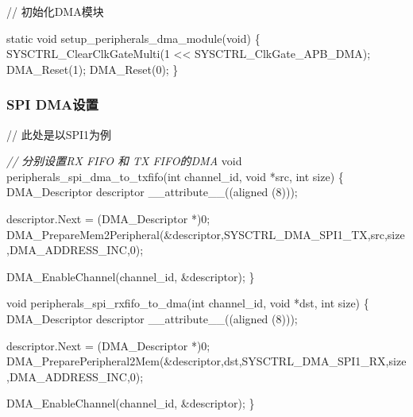 \documentclass[
  12pt,
]{book}
\newenvironment{Shaded}{\begin{snugshade}}{\end{snugshade}}
\newcommand{\CommentTok}[1]{\textcolor[rgb]{0.56,0.35,0.01}{\textit{#1}}}
\newcommand{\DataTypeTok}[1]{\textcolor[rgb]{0.13,0.29,0.53}{#1}}
\newcommand{\DecValTok}[1]{\textcolor[rgb]{0.00,0.00,0.81}{#1}}
\newcommand{\NormalTok}[1]{#1}
\begin{document}
// 初始化DMA模块

\begin{Shaded}
\begin{Highlighting}[]
\DataTypeTok{static} \DataTypeTok{void}\NormalTok{ setup_peripherals_dma_module(}\DataTypeTok{void}\NormalTok{)}
\NormalTok{\{}
\NormalTok{    SYSCTRL_ClearClkGateMulti(}\DecValTok{1}\NormalTok{ << SYSCTRL_ClkGate_APB_DMA);}
\NormalTok{    DMA_Reset(}\DecValTok{1}\NormalTok{);}
\NormalTok{    DMA_Reset(}\DecValTok{0}\NormalTok{);}
\NormalTok{\}}
\end{Highlighting}
\end{Shaded}

\hypertarget{spi-dmaux8bbeux7f6e-3}{%
\subsubsection{SPI DMA设置}\label{spi-dmaux8bbeux7f6e-3}}

// 此处是以SPI1为例

\begin{Shaded}
\begin{Highlighting}[]
\CommentTok{// 分别设置RX FIFO 和 TX FIFO的DMA}
\DataTypeTok{void}\NormalTok{ peripherals_spi_dma_to_txfifo(}\DataTypeTok{int}\NormalTok{ channel_id, }\DataTypeTok{void}\NormalTok{ *src, }\DataTypeTok{int}\NormalTok{ size)}
\NormalTok{\{}
\NormalTok{    DMA_Descriptor descriptor __attribute__((aligned (}\DecValTok{8}\NormalTok{)));}

\NormalTok{    descriptor.Next = (DMA_Descriptor *)}\DecValTok{0}\NormalTok{;}
\NormalTok{    DMA_PrepareMem2Peripheral(&descriptor,SYSCTRL_DMA_SPI1_TX,src,size,DMA_ADDRESS_INC,}\DecValTok{0}\NormalTok{);}

\NormalTok{    DMA_EnableChannel(channel_id, &descriptor);}
\NormalTok{\}}

\DataTypeTok{void}\NormalTok{ peripherals_spi_rxfifo_to_dma(}\DataTypeTok{int}\NormalTok{ channel_id, }\DataTypeTok{void}\NormalTok{ *dst, }\DataTypeTok{int}\NormalTok{ size)}
\NormalTok{\{}
\NormalTok{    DMA_Descriptor descriptor __attribute__((aligned (}\DecValTok{8}\NormalTok{)));}

\NormalTok{    descriptor.Next = (DMA_Descriptor *)}\DecValTok{0}\NormalTok{;}
\NormalTok{    DMA_PreparePeripheral2Mem(&descriptor,dst,SYSCTRL_DMA_SPI1_RX,size,DMA_ADDRESS_INC,}\DecValTok{0}\NormalTok{);}

\NormalTok{    DMA_EnableChannel(channel_id, &descriptor);}
\NormalTok{\}}
\end{Highlighting}
\end{Shaded}
\end{document}
